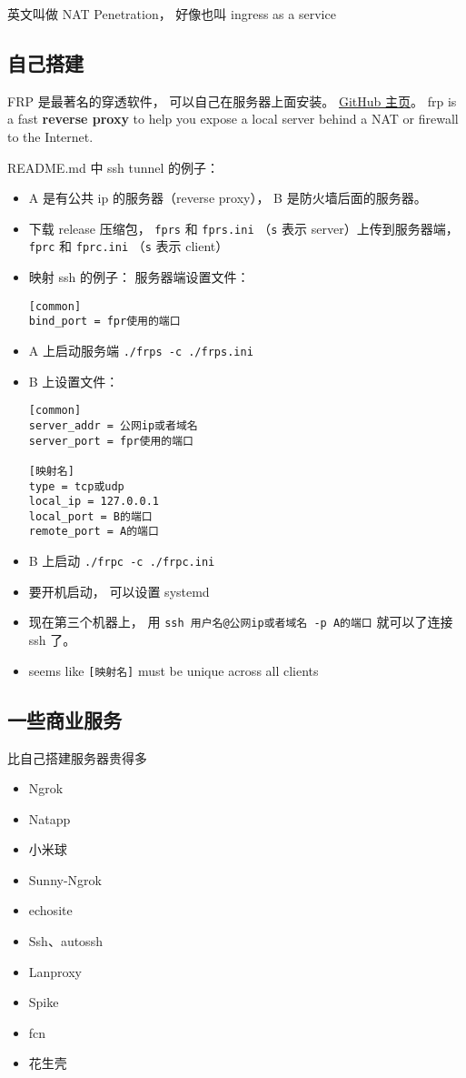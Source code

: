 
\begin{issues}
\issueDraft
\end{issues}

英文叫做 NAT Penetration， 好像也叫 ingress as a service

\subsection{自己搭建}
FRP 是最著名的穿透软件， 可以自己在服务器上面安装。 \href{https://github.com/fatedier/frp}{GitHub 主页}。
frp is a fast \textbf{reverse proxy} to help you expose a local server behind a NAT or firewall to the Internet.

README.md 中 ssh tunnel 的例子：
\begin{itemize}
\item A 是有公共 ip 的服务器（reverse proxy）， B 是防火墙后面的服务器。
\item 下载 release 压缩包， \verb|fprs| 和 \verb|fprs.ini| （\verb|s| 表示 server）上传到服务器端， \verb|fprc| 和 \verb|fprc.ini| （\verb|s| 表示 client）
\item 映射 ssh 的例子： 服务器端设置文件：
\begin{lstlisting}[language=none,caption=fprs.ini]
[common]
bind_port = fpr使用的端口
\end{lstlisting}
\item A 上启动服务端 \verb|./frps -c ./frps.ini|
\item B 上设置文件：
\begin{lstlisting}[language=none,caption=fprc.ini]
[common]
server_addr = 公网ip或者域名
server_port = fpr使用的端口

[映射名]
type = tcp或udp
local_ip = 127.0.0.1
local_port = B的端口
remote_port = A的端口
\end{lstlisting}
\item B 上启动 \verb|./frpc -c ./frpc.ini|
\item 要开机启动， 可以设置 systemd
\item 现在第三个机器上， 用 \verb|ssh 用户名@公网ip或者域名 -p A的端口| 就可以了连接 ssh 了。
\item seems like \verb|[映射名]| must be unique across all clients
\end{itemize}

\subsection{一些商业服务}
比自己搭建服务器贵得多
\begin{itemize}
\item Ngrok
\item Natapp
\item 小米球
\item Sunny-Ngrok
\item echosite
\item Ssh、autossh
\item Lanproxy
\item Spike
\item fcn
\item 花生壳
\end{itemize}

